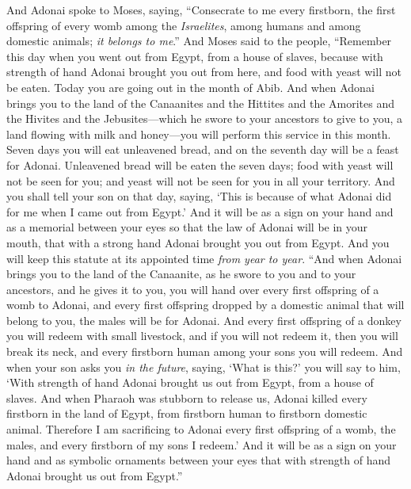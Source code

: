 \begin{biblechapter} %
 And Adonai spoke to Moses, saying,
\verse “Consecrate to me every firstborn, the first offspring of every womb among the \textit{Israelites}, among humans and among domestic animals; \textit{it belongs to me}.”
\verse And Moses said to the people, “Remember this day when you went out from Egypt, from a house of slaves, because with strength of hand Adonai brought you out from here, and food with yeast will not be eaten.
\verse Today you are going out in the month of Abib.
\verse And when Adonai brings you to the land of the Canaanites and the Hittites and the Amorites and the Hivites and the Jebusites—which he swore to your ancestors to give to you, a land flowing with milk and honey—you will perform this service in this month.
\verse Seven days you will eat unleavened bread, and on the seventh day will be a feast for Adonai.
\verse Unleavened bread will be eaten the seven days; food with yeast will not be seen for you; and yeast will not be seen for you in all your territory.
\verse And you shall tell your son on that day, saying, ‘This is because of what Adonai did for me when I came out from Egypt.’
\verse And it will be as a sign on your hand and as a memorial between your eyes so that the law of Adonai will be in your mouth, that with a strong hand Adonai brought you out from Egypt.
\verse And you will keep this statute at its appointed time \textit{from year to year}.
\verse “And when Adonai brings you to the land of the Canaanite, as he swore to you and to your ancestors, and he gives it to you,
\verse you will hand over every first offspring of a womb to Adonai, and every first offspring dropped by a domestic animal that will belong to you, the males will be for Adonai.
\verse And every first offspring of a donkey you will redeem with small livestock, and if you will not redeem it, then you will break its neck, and every firstborn human among your sons you will redeem.
\verse And when your son asks you \textit{in the future}, saying, ‘What is this?’ you will say to him, ‘With strength of hand Adonai brought us out from Egypt, from a house of slaves.
\verse And when Pharaoh was stubborn to release us, Adonai killed every firstborn in the land of Egypt, from firstborn human to firstborn domestic animal. Therefore I am sacrificing to Adonai every first offspring of a womb, the males, and every firstborn of my sons I redeem.’
\verse And it will be as a sign on your hand and as symbolic ornaments between your eyes that with strength of hand Adonai brought us out from Egypt.”

\end{biblechapter}
